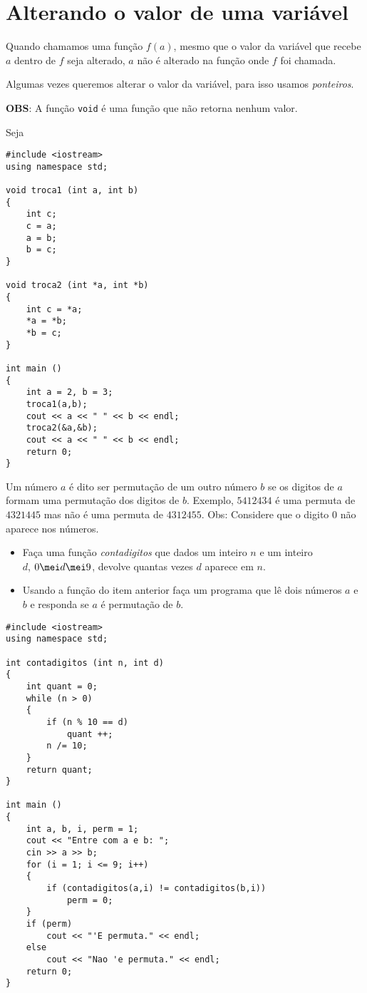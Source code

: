 \documentclass[a4paper]{memoir}
\begin{document}
\section{Alterando o valor de uma variável}

Quando chamamos uma função $f(a)$, mesmo que o valor da variável que recebe $a$ dentro de $f$ seja alterado, $a$ não é alterado na função onde $f$ foi chamada.

Algumas vezes queremos alterar o valor da variável, para isso usamos \emph{ponteiros}.

\textbf{OBS}: A função \verb|void| é uma função que não retorna nenhum valor.

\begin{ex}
Seja

\begin{lstlisting}
#include <iostream>
using namespace std;

void troca1 (int a, int b)
{
    int c;
    c = a;
    a = b;
    b = c;
}

void troca2 (int *a, int *b)
{
    int c = *a;
    *a = *b;
    *b = c;
}

int main ()
{
    int a = 2, b = 3;
    troca1(a,b);
    cout << a << " " << b << endl;
    troca2(&a,&b);
    cout << a << " " << b << endl;
    return 0;
}
\end{lstlisting}
\end{ex}

\begin{prob}\label{prob211.cpp}
Um número $a$ é dito ser permutação de um outro número $b$ se os digitos de $a$ formam uma permutação dos digitos de $b$. Exemplo, $5412434$ é uma permuta de $4321445$ mas não é uma permuta de $4312455$. Obs: Considere que o digito $0$ não aparece nos números.

\begin{itemize}
 \item Faça uma função \emph{contadigitos} que dados um inteiro $n$ e um inteiro\\ $d$, $0 \mei d \mei 9$, devolve quantas vezes $d$ aparece em $n$.
 \item Usando a função do item anterior faça um programa que lê dois números $a$ e $b$ e responda se $a$ é permutação de $b$.
\end{itemize}
\end{prob}

\begin{sol}
\begin{lstlisting}
#include <iostream>
using namespace std;

int contadigitos (int n, int d)
{
    int quant = 0;
    while (n > 0)
    {
        if (n % 10 == d)
            quant ++;
        n /= 10;
    }
    return quant;
}

int main ()
{
    int a, b, i, perm = 1;
    cout << "Entre com a e b: ";
    cin >> a >> b;
    for (i = 1; i <= 9; i++)
    {
        if (contadigitos(a,i) != contadigitos(b,i))
            perm = 0;
    }
    if (perm)
        cout << "'E permuta." << endl;
    else
        cout << "Nao 'e permuta." << endl;
    return 0;
}
\end{lstlisting}
\end{sol}
\end{document}
